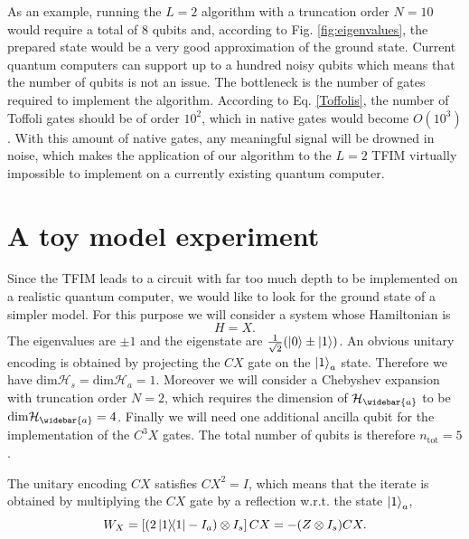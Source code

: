 \documentclass[a4paper,11pt]{article}
\begin{document}
As an example, running the $L=2$ algorithm with a truncation order $N = 10$ would require a total of $8$ qubits and, according to Fig. \ref{fig:eigenvalues}, the prepared state would be a very good approximation of the ground state. Current quantum computers can support up to a hundred noisy qubits which means that the number of qubits is not an issue. The bottleneck is the number of gates required to implement the algorithm. According to Eq. \eqref{Toffolis}, the number of Toffoli gates should be of order $10^2$, which in native gates would become $O(10^3)$. With this amount of native gates, any meaningful signal will be drowned in noise, which makes the application of our algorithm to the $L=2$ TFIM virtually impossible to implement on a currently existing quantum computer.


\section{A toy model experiment}
\label{sec:TOY}

Since the TFIM leads to a circuit with far too much depth to be implemented on a realistic quantum computer, we would like to look for the ground state of a simpler model. For this purpose we will consider a system whose Hamiltonian is 
\begin{equation}
    H=X.
\end{equation}
The eigenvalues are $\pm 1$ and the eigenstate are $\frac{1}{\sqrt{2}}(\ket{0}\pm\ket{1})$. An obvious unitary encoding is obtained by projecting the $CX$ gate on the $\ket{1}_a$ state. Therefore we have $\mathrm{dim}\mathcal{H}_s = \mathrm{dim}\mathcal{H}_a =1$. Moreover we will consider a Chebyshev expansion with truncation order $N=2$, which requires the dimension of  $\mathcal{H}_{\widebar{a}}$ to be $\mathrm{dim}\mathcal{H}_{\widebar{a}} = 4$. Finally we will need one additional ancilla qubit for the implementation of the $C^3X$ gates. The total number of qubits is therefore $n_{\mathrm{tot}}=5$. 

The unitary encoding $CX$ satisfies $CX^2= I$, which means that the iterate is obtained by multiplying the $CX$ gate by a reflection w.r.t. the state $\ket{1}_a$,
\begin{equation}
    W_X =\left[ (2\ketbra{1}-I_a)\otimes I_s\right]CX = -(Z\otimes I_s)CX.
    \label{WX}
\end{equation}
\end{document}
